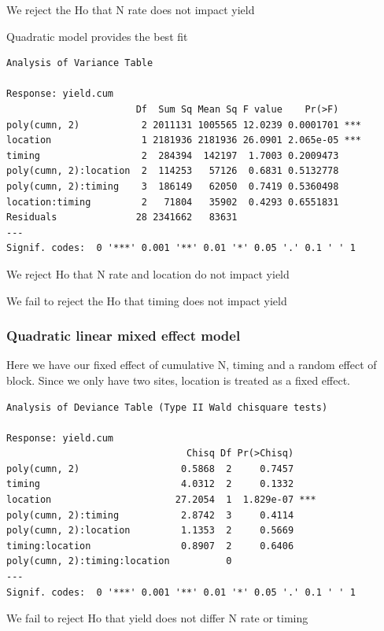 \documentclass[
  letterpaper,
  DIV=11,
  numbers=noendperiod]{scrartcl}
\begin{document}
We reject the Ho that N rate does not impact yield

Quadratic model provides the best fit

\begin{verbatim}
Analysis of Variance Table

Response: yield.cum
                       Df  Sum Sq Mean Sq F value    Pr(>F)    
poly(cumn, 2)           2 2011131 1005565 12.0239 0.0001701 ***
location                1 2181936 2181936 26.0901 2.065e-05 ***
timing                  2  284394  142197  1.7003 0.2009473    
poly(cumn, 2):location  2  114253   57126  0.6831 0.5132778    
poly(cumn, 2):timing    3  186149   62050  0.7419 0.5360498    
location:timing         2   71804   35902  0.4293 0.6551831    
Residuals              28 2341662   83631                      
---
Signif. codes:  0 '***' 0.001 '**' 0.01 '*' 0.05 '.' 0.1 ' ' 1
\end{verbatim}

We reject Ho that N rate and location do not impact yield

We fail to reject the Ho that timing does not impact yield

\hypertarget{quadratic-linear-mixed-effect-model}{%
\subsubsection{Quadratic linear mixed effect
model}\label{quadratic-linear-mixed-effect-model}}

Here we have our fixed effect of cumulative N, timing and a random
effect of block. Since we only have two sites, location is treated as a
fixed effect.

\begin{verbatim}
Analysis of Deviance Table (Type II Wald chisquare tests)

Response: yield.cum
                                Chisq Df Pr(>Chisq)    
poly(cumn, 2)                  0.5868  2     0.7457    
timing                         4.0312  2     0.1332    
location                      27.2054  1  1.829e-07 ***
poly(cumn, 2):timing           2.8742  3     0.4114    
poly(cumn, 2):location         1.1353  2     0.5669    
timing:location                0.8907  2     0.6406    
poly(cumn, 2):timing:location          0               
---
Signif. codes:  0 '***' 0.001 '**' 0.01 '*' 0.05 '.' 0.1 ' ' 1
\end{verbatim}

We fail to reject Ho that yield does not differ N rate or timing
\end{document}
